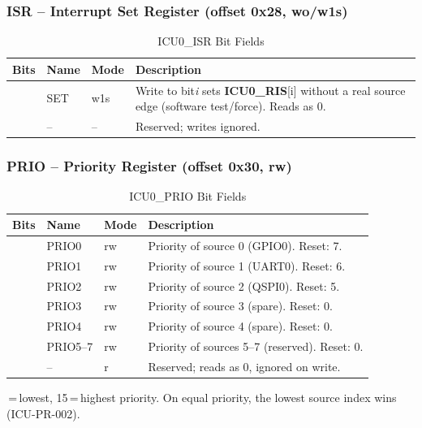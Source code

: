\subsubsection{ISR -- Interrupt Set Register (offset 0x28, wo/w1s)}

\begin{table}[H]
\caption{ICU0\_ISR Bit Fields}
\label{tab:asIcuISR}
\centering
\begin{tabularx}{\textwidth}{|l |l |l |X|}
  \hline
  Bits & Name & Mode & Description \\
  \hline
  \hline
  [7:0] & SET & w1s & Write\;1 to bit\emph{i} sets \textbf{ICU0\_RIS}[i]
    without a real source edge (software test/force). Reads as 0. \\
  \hline
  [63:8] & -- & -- & Reserved; writes ignored. \\
  \hline
\end{tabularx}
\end{table}

\subsubsection{PRIO -- Priority Register (offset 0x30, rw)}

\begin{table}[H]
\caption{ICU0\_PRIO Bit Fields}
\label{tab:asIcuPRIO}
\centering
\begin{tabularx}{\textwidth}{|l |l |l |X|}
  \hline
  Bits & Name & Mode & Description \\
  \hline
  \hline
  [3:0]   & PRIO0 & rw & Priority of source 0 (GPIO0). Reset: 7. \\
  \hline
  [7:4]   & PRIO1 & rw & Priority of source 1 (UART0). Reset: 6. \\
  \hline
  [11:8]  & PRIO2 & rw & Priority of source 2 (QSPI0). Reset: 5. \\
  \hline
  [15:12] & PRIO3 & rw & Priority of source 3 (spare). Reset: 0. \\
  \hline
  [19:16] & PRIO4 & rw & Priority of source 4 (spare). Reset: 0. \\
  \hline
  [31:20] & PRIO5--7 & rw & Priority of sources 5--7 (reserved). Reset: 0. \\
  \hline
  [63:32] & -- & r & Reserved; reads as 0, ignored on write. \\
  \hline
\end{tabularx}
\end{table}
\,=\,lowest, 15\,=\,highest priority. On equal priority, the
lowest source index wins (ICU-PR-002).

